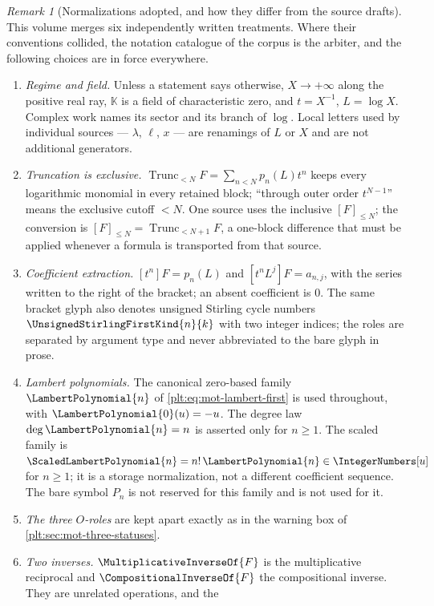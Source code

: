 \documentclass[11pt,oneside]{article}
\theoremstyle{plain}
\theoremstyle{definition}
\theoremstyle{remark}
\newtheorem{remark}[theorem]{Remark}
\newcommand{\K}{\mathbb{K}}
\newcommand{\Trunc}[2]{\operatorname{Trunc}_{<#2}#1}     %
\newcommand{\rev}[1]{\CompositionalInverseOf{#1}}
\newcommand{\recip}[1]{\MultiplicativeInverseOf{#1}}
\newcommand{\stirlingone}[2]{\UnsignedStirlingFirstKind{#1}{#2}}
\newcommand{\LamP}[1]{\LambertPolynomial{#1}}
\newcommand{\LamPsc}[1]{\ScaledLambertPolynomial{#1}}
\begin{document}
\begin{remark}[Normalizations adopted, and how they differ from the source
drafts]
\label{plt:rmk:mot-normalizations}
This volume merges six independently written treatments.  Where their
conventions collided, the notation catalogue of the corpus is the arbiter, and
the following choices are in force everywhere.
\begin{enumerate}
\item \emph{Regime and field.}  Unless a statement says otherwise,
  \(X\to+\infty\) along the positive real ray, \(\K\) is a field of
  characteristic zero, and \(t=X^{-1}\), \(L=\log X\).  Complex work names its
  sector and its branch of \(\log\).  Local letters used by individual sources
  --- \(\lambda\), \(\ell\), \(x\) --- are renamings of \(L\) or \(X\) and are
  not additional generators.
\item \emph{Truncation is exclusive.}
  \(\Trunc{F}{N}=\sum_{n<N}p_{n}(L)t^{n}\) keeps every logarithmic monomial in
  every retained block; ``through outer order \(t^{N-1}\)'' means the exclusive
  cutoff \(<N\).  One source uses the inclusive \([F]_{\le N}\); the conversion
  is \([F]_{\le N}=\Trunc{F}{N+1}\), a one-block difference that must be
  applied whenever a formula is transported from that source.
\item \emph{Coefficient extraction.}  \([t^{n}]F=p_{n}(L)\) and
  \([t^{n}L^{j}]F=a_{n,j}\), with the series written to the right of the
  bracket; an absent coefficient is \(0\).  The same bracket glyph also denotes
  unsigned Stirling cycle numbers \(\stirlingone{n}{k}\) with two integer
  indices; the roles are separated by argument type and never abbreviated to
  the bare glyph in prose.
\item \emph{Lambert polynomials.}  The canonical zero-based family
  \(\LamP{n}\) of \eqref{plt:eq:mot-lambert-first} is used throughout, with
  \(\LamP{0}(u)=-u\).  The degree law \(\deg\LamP{n}=n\) is asserted only for
  \(n\ge1\).  The scaled family is
  \(\LamPsc{n}=n!\,\LamP{n}\in\IntegerNumbers[u]\) for \(n\ge1\); it is a
  storage normalization, not a different coefficient sequence.  The bare symbol
  \(P_{n}\) is not reserved for this family and is not used for it.
\item \emph{The three \(O\)-roles} are kept apart exactly as in the warning box
  of \cref{plt:sec:mot-three-statuses}.
\item \emph{Two inverses.}  \(\recip{F}\) is the multiplicative reciprocal and
  \(\rev{F}\) the compositional inverse.  They are unrelated operations, and the

\end{enumerate}
\end{remark}
\end{document}
